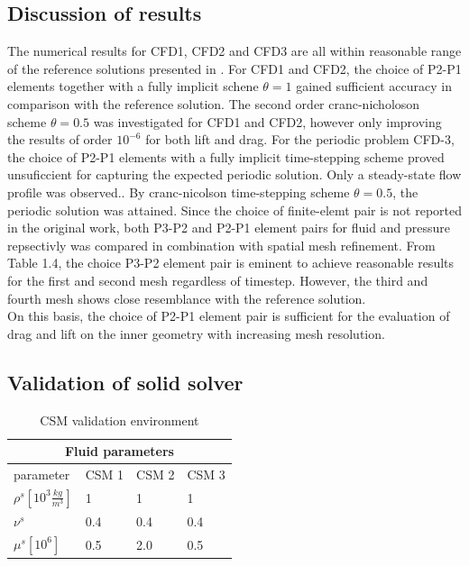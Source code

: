 \subsection{Discussion of results}
The numerical results for CFD1, CFD2 and CFD3 are all within reasonable range of the reference solutions presented in \cite{Hron2006}. 
For CFD1 and CFD2, the choice of P2-P1 elements together with a fully implicit schene $\theta = 1$ gained sufficient accuracy in comparison with the reference solution. The second order cranc-nicholoson scheme  $\theta = 0.5$ was investigated for CFD1 and CFD2, however only improving the results of order $10^{-6}$ for both lift and drag. For the periodic problem CFD-3, the choice of  P2-P1 elements with a fully implicit time-stepping scheme proved unsuficcient for capturing the expected periodic solution. Only a steady-state flow profile was observed.. By cranc-nicolson time-stepping scheme $\theta = 0.5$, the periodic solution was attained. Since the choice of finite-elemt pair is not reported in the original work, both P3-P2 and P2-P1 element pairs for fluid and pressure repsectivly was compared in combination with spatial mesh refinement. From Table 1.4, the choice P3-P2 element pair is eminent to achieve reasonable results for the first and second mesh regardless of timestep.  However, the third and fourth mesh shows close resemblance with the reference solution. \\
On this basis, the choice of P2-P1 element pair is sufficient for the evaluation of drag and lift on the inner geometry with increasing mesh resolution. 

\newpage
\subsection{Validation of solid solver}
\begin{table}[h!]
\centering
\caption{CSM validation environment}
\label{my-label}
\begin{tabular}{ |p{3cm}||p{2cm}|p{2cm}|p{2cm}|  }
 \hline
 \multicolumn{4}{|c|}{Fluid parameters} \\
 \hline
 parameter              & CSM 1 & CSM 2 & CSM 3 \\
 \hline
$\rho^s [10^{3}\frac{kg}{m^3}]$ & 1    & 1    & 1    \\
$\nu^s $  & 0.4    & 0.4    & 0.4    \\
$\mu^s  [10^{6}]$  & 0.5    & 2.0    & 0.5    \\

\hline
\end{tabular}
\end{table}

